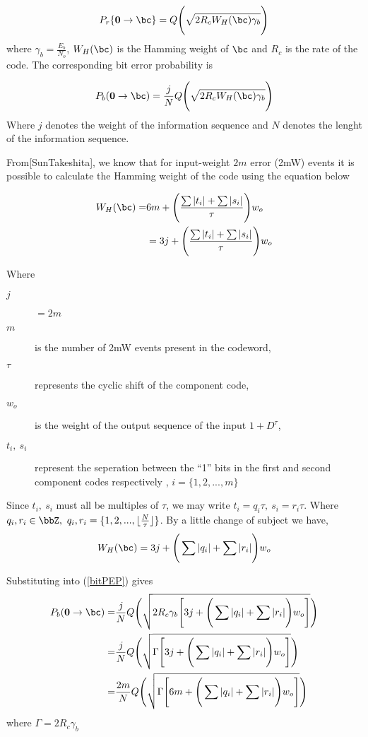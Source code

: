 \documentclass[11pt, oneside, dvipdfmx]{book}
\begin{document}
\begin{equation}
P_r\{\mathbf{0} \rightarrow \bc\} =Q\Bigg( \sqrt{2R_cW_H(\bc)\gamma_b}\Bigg)
\end{equation}
where $\gamma_b=\frac{E_b}{N_o}$, $W_H(\bc)$ is the Hamming weight of $\bc$ and $R_c$ is the rate of the code.
The corresponding bit error probability is

\begin{equation}
P_b(\mathbf{0} \rightarrow \bc) =\frac{j}{N}Q\Bigg( \sqrt{2R_cW_H(\bc)\gamma_b}\Bigg)
\label{bitPEP}
\end{equation}
Where $j$ denotes the weight of the information sequence and $N$ denotes the lenght of the information sequence.
 
From[SunTakeshita], we know that for input-weight $2m$ error (2mW) events it is possible to calculate the Hamming weight of the code using the equation below

\begin{equation}
\begin{split}
W_H(\bc)=&6m +\Bigg( \frac{\sum |t_i| + \sum |s_i|}{\tau} \Bigg) w_o\\
&=3j +\Bigg( \frac{\sum |t_i| + \sum |s_i|}{\tau} \Bigg) w_o
\end{split}
\end{equation}

Where 
\begin{description}
\item [$j$] $ = 2m$
\item [$m$] is the number of 2mW events present in the codeword, 
\item [$\tau$] represents the cyclic shift of the component code, 
\item[$w_o$] is the weight of the output sequence of the input $1+D^{\tau}$, 
\item[$t_i,~s_i$] represent the seperation between the ``1'' bits in the first and second component codes respectively , $i=\{1,2,...,m\}$

\end{description}
Since $t_i,~s_i$ must all be multiples of $\tau$, we may write $t_i=q_i\tau,~s_i=r_i\tau$. Where $q_i,r_i \in \bbZ,~q_i,r_i =\{1,2,...,\lfloor \frac{N}{\tau} \rfloor \}$.
By a little change of subject we have,
\begin{equation}
W_H(\bc)=3j +\Bigg( \sum |q_i| + \sum |r_i| \Bigg) w_o
\end{equation}

Substituting into (\ref{bitPEP}) gives
\begin{equation}
\begin{split}
P_b(\mathbf{0} \rightarrow \bc) =&\frac{j}{N}Q\Bigg( \sqrt{2R_c\gamma_b \Bigg[3j +\Bigg( \sum |q_i| + \sum |r_i| \Bigg) w_o\Bigg]}\Bigg)\\
=&\frac{j}{N}Q\Bigg( \sqrt{\Gamma \Bigg[3j +\Bigg( \sum |q_i| + \sum |r_i| \Bigg) w_o\Bigg]}\Bigg)\\
=&\frac{2m}{N}Q\Bigg( \sqrt{\Gamma \Bigg[6m +\Bigg( \sum |q_i| + \sum |r_i| \Bigg) w_o\Bigg]}\Bigg)\\
\end{split}
\end{equation}
where $\Gamma =2R_c\gamma_b$
\end{document}
